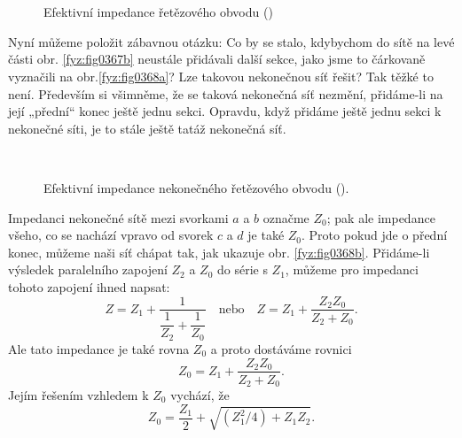   \begin{figure}[ht!] %
    \centering
       \\
       \\
    \caption{Efektivní impedance řetězového obvodu
             (\cite[s.~407]{Feynman02})}
    \label{fyz:fig0367}
  \end{figure}
  
  Nyní můžeme položit zábavnou otázku: Co by se stalo, kdybychom do sítě na levé části obr. 
  \ref{fyz:fig0367b} neustále přidávali další sekce, jako jsme to čárkovaně vyznačili na 
  obr.\ref{fyz:fig0368a}? Lze takovou nekonečnou síť řešit? Tak těžké to není. Především si 
  všimněme, že se taková nekonečná síť nezmění, přidáme-li na její „přední“ konec ještě jednu 
  sekci. Opravdu, když přidáme ještě jednu sekci k nekonečné síti, je to stále ještě tatáž 
  nekonečná síť.
  
  \begin{figure}[ht!] %
    \centering
       \\
    \caption{Efektivní impedance nekonečného řetězového obvodu
             (\cite[s.~408]{Feynman02}).}
    \label{fyz:fig0368}
  \end{figure}

  Impedanci nekonečné sítě mezi svorkami \(a\) a \(b\) označme \(Z_0\); pak ale impedance všeho, co 
  se nachází vpravo od svorek \(c\) a \(d\) je také \(Z_0\). Proto pokud jde o přední konec, můžeme 
  naši síť chápat tak, jak ukazuje obr. \ref{fyz:fig0368b}. Přidáme-li výsledek paralelního zapojení 
  \(Z_2\) a \(Z_0\) do série s \(Z_1\), můžeme pro impedanci tohoto zapojení ihned napsat:
  \begin{equation*}
    Z = Z_1 + \dfrac{1}{\dfrac{1}{Z_2}+\dfrac{1}{Z_0}} \quad\text{nebo}\quad
    Z = Z_1 + \dfrac{Z_2Z_0}{Z_2 + Z_0}.
  \end{equation*}
  Ale tato impedance je také rovna \(Z_0\) a proto dostáváme rovnici
  \begin{equation*}
    Z_0 = Z_1 + \dfrac{Z_2Z_0}{Z_2 + Z_0}.
  \end{equation*}
  Jejím řešením vzhledem k \(Z_0\) vychází, že
  \begin{equation}\label{fyz:eq498}
    Z_0 = \dfrac{Z_1}{2} + \sqrt{(Z_1^2/4) + Z_1Z_2}.
  \end{equation}
  
